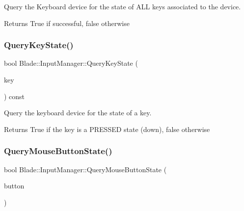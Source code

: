 Query the Keyboard device for the state of A\+LL keys associated to the device. 

\begin{DoxyReturn}{Returns}
True if successful, false otherwise 
\end{DoxyReturn}
\mbox{\label{class_blade_1_1_input_manager_a8d8e424cb1de012c830296a0812ceebc}} 
\subsubsection{\texorpdfstring{Query\+Key\+State()}{QueryKeyState()}}
{\footnotesize\ttfamily bool Blade\+::\+Input\+Manager\+::\+Query\+Key\+State (\begin{DoxyParamCaption}\item[{Virtual\+Key}]{key }\end{DoxyParamCaption}) const\hspace{0.3cm}{\ttfamily [noexcept]}}



Query the keyboard device for the state of a key. 

\begin{DoxyReturn}{Returns}
True if the key is a P\+R\+E\+S\+S\+ED state (down), false otherwise 
\end{DoxyReturn}
\mbox{\label{class_blade_1_1_input_manager_ad2537487a4c3c80e7eb6b8c0ea37b09b}} 
\subsubsection{\texorpdfstring{Query\+Mouse\+Button\+State()}{QueryMouseButtonState()}}
{\footnotesize\ttfamily bool Blade\+::\+Input\+Manager\+::\+Query\+Mouse\+Button\+State (\begin{DoxyParamCaption}\item[{Mouse\+Button}]{button }\end{DoxyParamCaption})}



